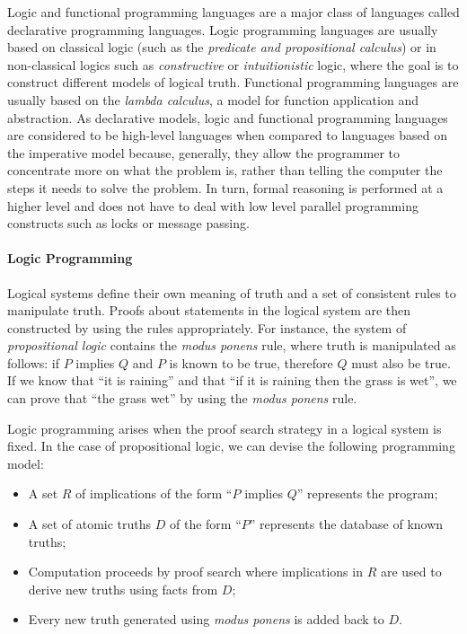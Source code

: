 Logic and functional programming languages are a major class of languages called
declarative programming languages. Logic programming languages are usually based
on classical logic (such as the \emph{predicate and propositional calculus}) or
in non-classical logics such as \emph{constructive} or \emph{intuitionistic}
logic, where the goal is to construct different models of logical truth.
Functional programming languages are usually based on the \emph{lambda
calculus}, a model for function application and abstraction. As declarative
models, logic and functional programming languages are considered to be
high-level languages when compared to languages based on the imperative model
because, generally, they allow the programmer to concentrate more on what the
problem is, rather than telling the computer the steps it needs to solve the
problem. In turn, formal reasoning is performed at a higher level and does not
have to deal with low level parallel programming constructs such as locks or
message passing.

\paragraph{Logic Programming}

Logical systems define their own meaning of truth and a set of consistent rules
to manipulate truth. Proofs about statements in the logical system are then
constructed by using the rules appropriately. For instance, the system of
\emph{propositional logic} contains the \emph{modus ponens} rule, where truth is
manipulated as follows: if $P$ implies $Q$ and $P$ is known to be true,
therefore $Q$ must also be true. If we know that ``it is raining'' and that ``if
it is raining then the grass is wet'', we can prove that ``the grass wet'' by
using the \emph{modus ponens} rule.

Logic programming arises when the proof search strategy in a logical system is
fixed. In the case of propositional logic, we can devise the following
programming model:

\begin{itemize}
   \item A set $R$ of implications of the form ``$P$ implies $Q$'' represents the
      program;
   \item A set of atomic truths $D$ of the form ``$P$'' represents the database of
      known truths;
   \item Computation proceeds by proof search where implications in $R$ are used
      to derive new truths using facts from $D$;
   \item Every new truth generated using \emph{modus ponens} is added back to
      $D$.
\end{itemize}


